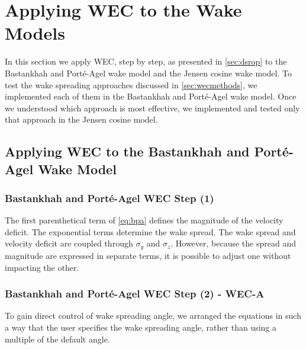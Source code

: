 \documentclass[a4paper]{jpconf}
\begin{document}
\section{Applying WEC to the  Wake Models}
In this section we apply WEC, step by step, as presented in \cref{sec:dsrop} to the Bastankhah and Port\'e-Agel wake model and the Jensen cosine wake model. To test the wake spreading approaches discussed in \cref{sec:wecmethods}, we implemented each of them in the Bastankhah and Port\'{e}-Agel wake model. Once we understood which approach is most effective, we implemented and tested only that approach in the Jensen cosine model.

\subsection{Applying WEC to the Bastankhah and Port\'e-Agel Wake Model}


\subsubsection{Bastankhah and Port\'e-Agel WEC Step (1)}
The first parenthetical term of \cref{eq:bpa} defines the magnitude of the velocity deficit. The exponential terms determine the wake spread. The wake spread and velocity deficit are coupled through $\sigma_y$ and $\sigma_z$. However, because the spread and magnitude are expressed in separate terms, it is possible to adjust one without impacting the other. 

\subsubsection{Bastankhah and Port\'e-Agel WEC Step (2) - WEC-A}
 To gain direct control of wake spreading angle, we arranged the equations in such a way that the user specifies the wake spreading angle, rather than using a multiple of the default angle. 
\end{document}
